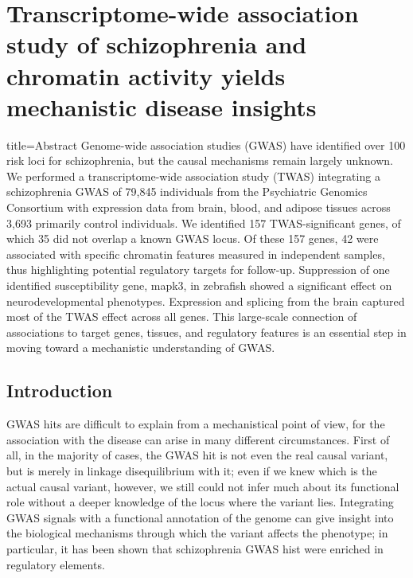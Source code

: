 \documentclass[../main.tex]{subfiles}
\begin{document}
\chapter{Transcriptome-wide association study of schizophrenia and 
chromatin activity yields mechanistic disease insights}

\begin{external_abstract}{title=Abstract}
Genome-wide association studies (GWAS) have identified over 100 risk 
loci for schizophrenia, but the causal mechanisms remain largely 
unknown. We performed a transcriptome-wide association study (TWAS) 
integrating a schizophrenia GWAS of 79,845 individuals from the 
Psychiatric Genomics Consortium with expression data from brain, blood, 
and adipose tissues across 3,693 primarily control individuals. We 
identified 157 TWAS-significant genes, of which 35 did not overlap a 
known GWAS locus. Of these 157 genes, 42 were associated with specific 
chromatin features measured in independent samples, thus highlighting 
potential regulatory targets for follow-up. Suppression of one 
identified susceptibility gene, mapk3, in zebrafish showed a significant 
effect on neurodevelopmental phenotypes. Expression and splicing from 
the brain captured most of the TWAS effect across all genes. This 
large-scale connection of associations to target genes, tissues, and 
regulatory features is an essential step in moving toward a mechanistic 
understanding of GWAS.
\end{external_abstract}

\section{Introduction}

GWAS hits are difficult to explain from a mechanistical point of view, 
for the association with the disease can arise in many different 
circumstances. First of all, in the majority of cases, the GWAS hit is 
not even the real causal variant, but is merely in linkage 
disequilibrium with it; even if we knew which is the actual causal 
variant, however, we still could not infer much about its functional 
role without a deeper knowledge of the locus where the variant lies. 
Integrating GWAS signals with a functional annotation of the genome can 
give insight into the biological mechanisms through which the variant 
affects the phenotype; in particular, it has been shown that 
schizophrenia GWAS hist were enriched in regulatory elements.
\end{document}

